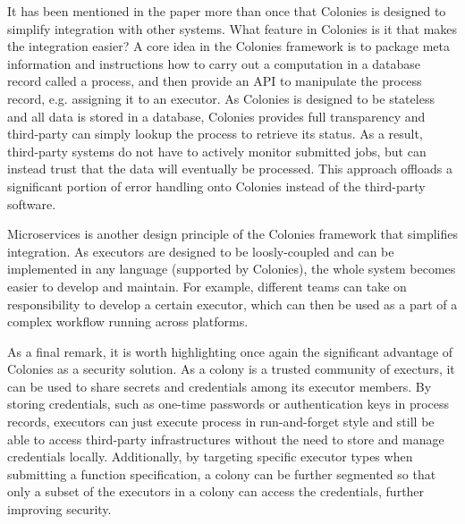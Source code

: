 \documentclass{article}
\begin{document}
It has been mentioned in the paper more than once that Colonies is designed to simplify integration with other systems. What feature in Colonies is it that makes the integration easier? A core idea in the Colonies framework is to package meta information and instructions how to carry out a computation in a database record called a process, and then provide an API to manipulate the process record, e.g. assigning it to an executor. As Colonies is designed to be stateless and all data is stored in a database, Colonies provides full transparency and third-party can simply lookup the process to retrieve its status. As a result, third-party systems do not have to actively monitor submitted jobs, but can instead trust that the data will eventually be processed. This approach offloads a significant portion of error handling onto Colonies instead of the third-party software.

Microservices is another design principle of the Colonies framework that simplifies integration. As executors are designed to be loosly-coupled and can be implemented in any language (supported by Colonies), the whole system becomes easier to develop and maintain. For example, different teams can take on responsibility to develop a certain executor, which can then be used as a part of a complex workflow running across platforms. 

As a final remark, it is worth highlighting once again the significant advantage of Colonies as a security solution. As a colony is a trusted community of execturs, it can be used to share secrets and credentials among its executor members. By storing credentials, such as one-time passwords or authentication keys in process records, executors can just execute process in run-and-forget style and still be able to access third-party infrastructures without the need to store and manage credentials locally. Additionally, by targeting specific executor types when submitting a function specification, a colony can be further segmented so that only a subset of the executors in a colony can access the credentials, further improving security. 


 

\newpage
\appendix
\end{document}
